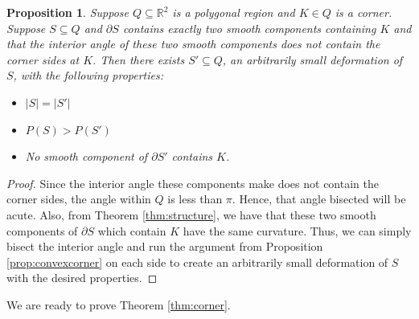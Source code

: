 \documentclass[leqno]{article}
\numberwithin{equation}{section}
\theoremstyle{definition}
\theoremstyle{remark}
\theoremstyle{plain}
\newtheorem{proposition}[equation]{Proposition}
\begin{document}
\begin{proposition}\label{prop:anycorner}Suppose $Q\subseteq\mathbb{R}^2$ is a polygonal region and $K\in Q$ is a corner.  Suppose $S\subseteq Q$ and $\partial S$ contains exactly two smooth components containing $K$ and that the interior angle of these two smooth components does not contain the corner sides at $K$.  Then there exists $S' \subseteq Q$, an arbitrarily small deformation of $S$, with the following properties:

\begin{itemize}\item $|S| = |S'|$
\item $P(S) > P(S')$
\item No smooth component of $\partial S'$ contains $K$.
\end{itemize}

\end{proposition}

\begin{proof}
    Since the interior angle these components make does not contain the corner sides, the angle within $Q$ is less than $\pi$. Hence, that angle bisected will be acute. Also, from Theorem \ref{thm:structure}, we have that these two smooth components of $\partial S$ which contain $K$ have the same curvature. Thus, we can simply bisect the interior angle and run the argument from Proposition \ref{prop:convexcorner} on each side to create an arbitrarily small deformation of $S$ with the desired properties. 
\end{proof}

We are ready to prove Theorem \ref{thm:corner}.
\end{document}
